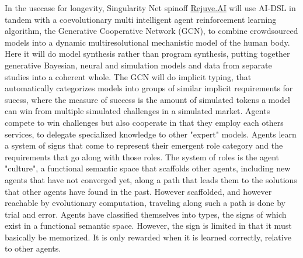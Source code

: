 \documentclass[]{report}
\begin{document}
In the usecase for longevity, Singularity Net spinoff
\href{https://rejuve.ai/}{Rejuve.AI} will use AI-DSL in tandem with a
coevolutionary multi intelligent agent reinforcement learning
algorithm, the Generative Cooperative Network (GCN), to combine
crowdsourced models into a dynamic multiresolutional mechanistic model
of the human body.  Here it will do model synthesis rather than
program synthesis, putting together generative Bayesian, neural and
simulation models and data from separate studies into a coherent
whole.  The GCN will do implicit typing, that automatically
categorizes models into groups of similar implicit requirements for
sucess, where the measure of success is the amount of simulated tokens
a model can win from multiple simulated challenges in a simulated
market. Agents compete to win challenges but also cooperate in that
they employ each others services, to delegate specialized knowledge to
other "expert" models. Agents learn a system of signs that come to
represent their emergent role category and the requirements that go
along with those roles.  The system of roles is the agent "culture", a
functional semantic space that scaffolds other agents, including new
agents that have not converged yet, along a path that leads them to
the solutions that other agents have found in the past. However
scaffolded, and however reachable by evolutionary computation,
traveling along such a path is done by trial and error. Agents have
classified themselves into types, the signs of which exist in a
functional semantic space. However, the sign is limited in that it
must basically be memorized. It is only rewarded when it is learned
correctly, relative to other agents.
\end{document}
